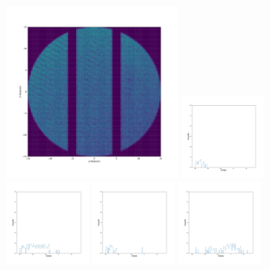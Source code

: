 \documentclass[12pt,prd]{article}
\begin{document}
\begin{figure}[h!]
\centering
\includegraphics[width=0.5\textwidth]{../figures/histogram2dgaiascan_l22_5_b74_4_ra209_6_dec23_3_npy.pdf}
\includegraphics[width=0.24\textwidth]{../figures/stars_near_zero_rahistgaiascan_l22_5_b74_4_ra209_6_dec23_3_npy_0.pdf}
\includegraphics[width=0.24\textwidth]{../figures/stars_near_zero_rahistgaiascan_l22_5_b74_4_ra209_6_dec23_3_npy_1.pdf}
\includegraphics[width=0.24\textwidth]{../figures/stars_near_zero_rahistgaiascan_l22_5_b74_4_ra209_6_dec23_3_npy_2.pdf}
\includegraphics[width=0.24\textwidth]{../figures/stars_near_zero_rahistgaiascan_l22_5_b74_4_ra209_6_dec23_3_npy_3.pdf}

\end{figure}
\end{document}
